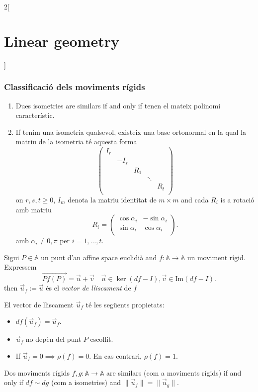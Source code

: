 \documentclass[class=article,10pt,crop=false]{standalone}
\begin{document}
\begin{multicols}{2}[\section{Linear geometry}]
\subsubsection{Classificació dels moviments rígids}
\begin{theorem}
\hfill
\begin{enumerate}
    \item Dues isometries are similars if and only if tenen el mateix polinomi característic.
    \item If tenim una isometria qualsevol, existeix una base ortonormal en la qual la matriu de la isometria té aquesta forma $$\begin{pmatrix}
    I_r &&&&\\
    & -I_s &&&\\
    && R_1 &&\\
    &&& \ddots &\\
    &&&& R_t\\
    \end{pmatrix}$$ on $r,s,t\geq 0$, $I_m$ denota la matriu identitat de $m\times m$ and cada $R_i$ is a rotació amb matriu $$R_i=\begin{pmatrix}
    \cos\alpha_i & -\sin\alpha_i\\
    \sin\alpha_i & \cos\alpha_i\\
    \end{pmatrix}.$$ amb $\alpha_i\ne0,\pi$ per $i=1,\ldots,t$.
\end{enumerate}
\end{theorem}
\begin{definition}
Sigui $P\in\mathbb{A}$ un punt d'an affine space euclidià and $f:\mathbb{A}\rightarrow\mathbb{A}$ un moviment rígid. Expressem $$\overrightarrow{Pf(P)}=\overrightarrow{u}+\overrightarrow{v}\quad\overrightarrow{u}\in\ker(df-I),\overrightarrow{v}\in\text{Im}(df-I).$$ then $\overrightarrow{u}_f:=\overrightarrow{u}$ és el \textit{vector de lliscament} de $f$
\end{definition}
\begin{prop}
El vector de lliscament $\overrightarrow{u}_f$ té les següents propietats:
\begin{itemize}
    \item $df(\overrightarrow{u}_f)=\overrightarrow{u}_f$.
    \item $\overrightarrow{u}_f$ no depèn del punt $P$ escollit.
    \item If $\overrightarrow{u}_f=0\implies\rho(f)=0$. En cas contrari, $\rho(f)=1$.
\end{itemize}
\end{prop}
\begin{theorem}
Dos moviments rígids $f,g:\mathbb{A}\rightarrow\mathbb{A}$ are similars (com a moviments rígids) if and only if $df\sim dg$ (com a isometries) and $\|\overrightarrow{u}_f\|=\|\overrightarrow{u}_g\|$.
\end{theorem}

\end{multicols}
\end{document}
